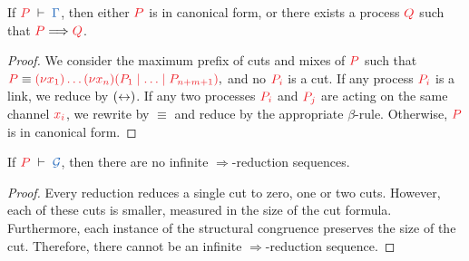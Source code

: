 \documentclass[envcountsame,envcountsect,UKenglish]{llncs}
\begin{document}
\begin{theorem}[Progress]\label{thm:hcp-progress}
  If $\seq[P]{\Gamma}$, then either $\tm{P}$ is in canonical form, or there exists a process $\tm{Q}$ such that $\tm{P}\Longrightarrow\tm{Q}$.
\end{theorem} 
\begin{proof}
  We consider the maximum prefix of cuts and mixes of $\tm{P}$ such that
  \(
  \tm{P} \equiv \tm{\piNew{x_1}{\dots\piNew{x_n}{(P_1 \ppar \dots \ppar P_{n+m+1})}}},
  \)
  and no $\tm{P_i}$ is a cut. If any process $\tm{P_i}$ is a link, we reduce by $({\leftrightarrow})$. If any two processes $\tm{P_i}$ and $\tm{P_j}$ are acting on the same channel $\tm{x_i}$, we rewrite by $\equiv$ and reduce by the appropriate $\beta$-rule. Otherwise, $\tm{P}$ is in canonical form.
\end{proof}
\begin{theorem}[Termination]\label{thm:hcp-termination}
  If $\seq[P]{\mathcal{G}}$, then there are no infinite $\Longrightarrow$-reduction sequences.
\end{theorem} 
\begin{proof}
  Every reduction reduces a single cut to zero, one or two cuts. However, each of these cuts is smaller, measured in the size of the cut formula. Furthermore, each instance of the structural congruence preserves the size of the cut. Therefore, there cannot be an infinite $\Longrightarrow$-reduction sequence.
\end{proof}
\end{document}
